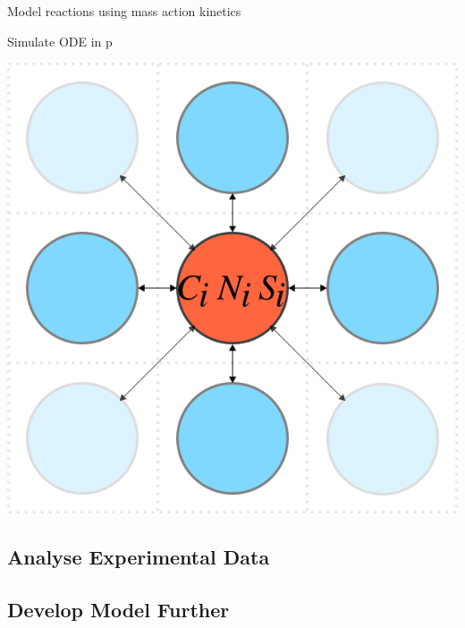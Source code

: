 Model reactions using mass action kinetics

Simulate ODE in p




\begin{Figure}
  \centering
  \includegraphics[width=\linewidth]{square_array}
  \label{fig:simple_model}
\end{Figure}

\subsection{Analyse Experimental Data}
\label{sec:analyse-data}

\subsection{Develop Model Further}
\label{sec:dev-mod-further}

